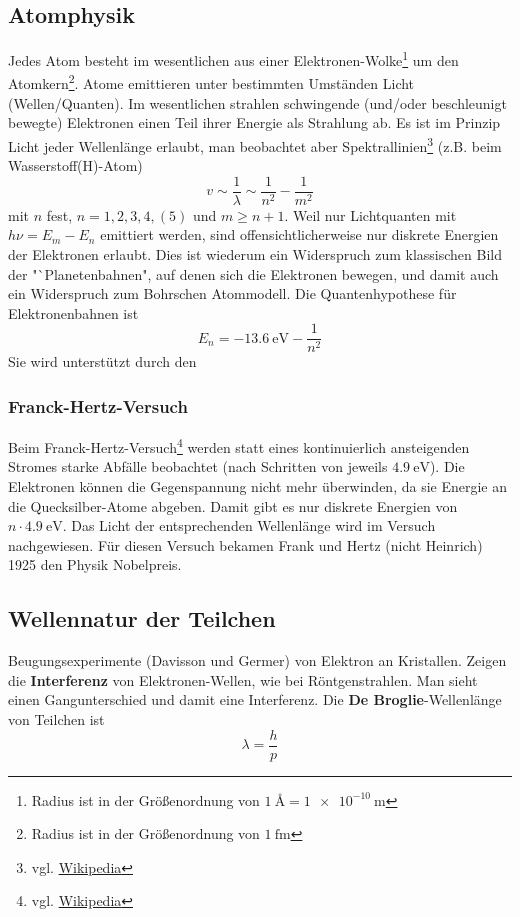 \subsection{Atomphysik}
Jedes Atom besteht im wesentlichen aus einer Elektronen-Wolke\footnote{Radius ist in der Größenordnung von $\SI{1}{\angstrom} = \SI{1e-10}{\meter}$} um den Atomkern\footnote{Radius ist in der Größenordnung von $\SI{1}{\femto\meter}$}. Atome emittieren unter bestimmten Umständen Licht (Wellen/Quanten). Im wesentlichen strahlen schwingende (und/oder beschleunigt bewegte) Elektronen einen Teil ihrer Energie als Strahlung ab.
Es ist im Prinzip Licht jeder Wellenlänge erlaubt, man beobachtet aber Spektrallinien\footnote{vgl. \href{https://de.wikipedia.org/wiki/Spektrallinie}{Wikipedia}} (z.B. beim Wasserstoff(H)-Atom)
$$v \sim \frac1\lambda \sim \frac{1}{n^2} - \frac{1}{m^2}$$
mit $n$ fest, $n = 1, 2, 3, 4, (5)$ und $m \geq n + 1$. Weil nur Lichtquanten mit $h \nu = E_m - E_n$ emittiert werden, sind offensichtlicherweise nur diskrete Energien der Elektronen erlaubt. Dies ist wiederum ein Widerspruch zum klassischen Bild der "`Planetenbahnen", auf denen sich die Elektronen bewegen, und damit auch ein Widerspruch zum Bohrschen Atommodell. Die Quantenhypothese für Elektronenbahnen ist 
$$E_n = \SI{-13.6}{\electronvolt} - \frac{1}{n^2}$$ 
Sie wird unterstützt durch den

\subsubsection{Franck-Hertz-Versuch}
Beim Franck-Hertz-Versuch\footnote{vgl. \href{https://de.wikipedia.org/wiki/Franck-Hertz-Versuch}{Wikipedia}} werden statt eines kontinuierlich ansteigenden Stromes starke Abfälle beobachtet (nach Schritten von jeweils $\SI{4.9}{\electronvolt}$). Die Elektronen können die Gegenspannung nicht mehr überwinden, da sie Energie an die Quecksilber-Atome abgeben. Damit gibt es nur diskrete Energien von $n \cdot \SI{4.9}{\electronvolt}$. Das Licht der entsprechenden Wellenlänge wird im Versuch nachgewiesen. Für diesen Versuch bekamen Frank und Hertz (nicht Heinrich) 1925 den Physik Nobelpreis.

\subsection{Wellennatur der Teilchen}
Beugungsexperimente (Davisson und Germer) von Elektron an Kristallen. Zeigen die \textbf{Interferenz} von Elektronen-Wellen, wie bei Röntgenstrahlen. Man sieht einen Gangunterschied und damit eine Interferenz. Die \textbf{De Broglie}-Wellenlänge von Teilchen ist
$$\lambda = \frac{h}{p}$$

